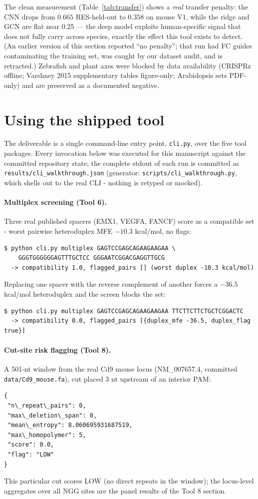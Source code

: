 \documentclass[12pt]{article}
\begin{document}
The clean measurement (Table~\ref{tab:transfer}) shows a \emph{real}
transfer penalty: the CNN drops from $0.665$ RES-held-out to $0.358$ on mouse
V1, while the ridge and GCN are flat near $0.25$ --- the deep model exploits
human-specific signal that does not fully carry across species, exactly the
effect this tool exists to detect. (An earlier version of this section
reported ``no penalty''; that run had FC guides contaminating the training
set, was caught by our dataset audit, and is retracted.) Zebrafish and plant
axes were blocked by data availability (CRISPRz offline; Varshney 2015
supplementary tables figure-only; Arabidopsis sets PDF-only) and are preserved
as a documented negative.



\section{Using the shipped tool}
\label{sec:cli-walkthrough}
The deliverable is a single command-line entry point, \texttt{cli.py}, over
the five tool packages. Every invocation below was executed for this
manuscript against the committed repository state; the complete stdout of
each run is committed as \texttt{results/cli\_walkthrough.json} (generator:
\texttt{scripts/cli\_walkthrough.py}, which shells out to the real CLI -
nothing is retyped or mocked).

\paragraph{Multiplex screening (Tool 6).}
Three real published spacers (EMX1, VEGFA, FANCF) score as a compatible
set - worst pairwise heteroduplex MFE $-10.3$ kcal/mol, no flags:
\begin{verbatim}
$ python cli.py multiplex GAGTCCGAGCAGAAGAAGAA \
    GGGTGGGGGGAGTTTGCTCC GGGAATCGGACGAGGTTGCG
  -> compatibility 1.0, flagged_pairs [] (worst duplex -10.3 kcal/mol)
\end{verbatim}
Replacing one spacer with the reverse complement of another forces a
$-36.5$ kcal/mol heteroduplex and the screen blocks the set:
\begin{verbatim}
$ python cli.py multiplex GAGTCCGAGCAGAAGAAGAA TTCTTCTTCTGCTCGGACTC
  -> compatibility 0.0, flagged_pairs [{duplex_mfe -36.5, duplex_flag true}]
\end{verbatim}

\paragraph{Cut-site risk flagging (Tool 8).}
A 501-nt window from the real Cd9 mouse locus (NM\_007657.4, committed
\texttt{data/Cd9\_mouse.fa}), cut placed 3 nt upstream of an interior PAM:
\begin{verbatim}
{
 "n\_repeat\_pairs": 0,
 "max\_deletion\_span": 0,
 "mean\_entropy": 8.060695931687519,
 "max\_homopolymer": 5,
 "score": 0.0,
 "flag": "LOW"
}
\end{verbatim}
This particular cut scores LOW (no direct repeats in the window); the
locus-level aggregates over all NGG sites are the panel results of the
Tool 8 section.
\end{document}
